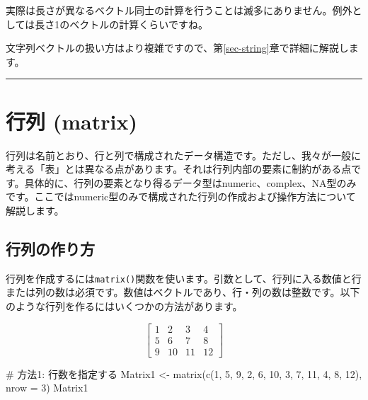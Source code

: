 \documentclass[
  a4paper,
  pandoc,
  ja=standard,
  jafont=haranoaji]{bxjsbook}
\newenvironment{Shaded}{\begin{snugshade}}{\end{snugshade}}
\newcommand{\AttributeTok}[1]{\textcolor[rgb]{0.00,0.48,0.65}{#1}}
\newcommand{\CommentTok}[1]{\textcolor[rgb]{0.37,0.37,0.37}{#1}}
\newcommand{\DecValTok}[1]{\textcolor[rgb]{0.68,0.00,0.00}{#1}}
\newcommand{\FunctionTok}[1]{\textcolor[rgb]{0.28,0.35,0.67}{#1}}
\newcommand{\NormalTok}[1]{\textcolor[rgb]{0.00,0.48,0.65}{#1}}
\newcommand{\OtherTok}[1]{\textcolor[rgb]{0.00,0.48,0.65}{#1}}
\begin{document}
実際は長さが異なるベクトル同士の計算を行うことは滅多にありません。例外としては長さ1のベクトルの計算くらいですね。

文字列ベクトルの扱い方はより複雑ですので、第\ref{sec-string}章で詳細に解説します。

\begin{center}\rule{0.5\linewidth}{0.5pt}\end{center}

\hypertarget{sec-datastructure_matrix}{%
\section{行列 (matrix)}\label{sec-datastructure_matrix}}

行列は名前とおり、行と列で構成されたデータ構造です。ただし、我々が一般に考える「表」とは異なる点があります。それは行列内部の要素に制約がある点です。具体的に、行列の要素となり得るデータ型はnumeric、complex、NA型のみです。ここではnumeric型のみで構成された行列の作成および操作方法について解説します。

\hypertarget{ux884cux5217ux306eux4f5cux308aux65b9}{%
\subsection{行列の作り方}\label{ux884cux5217ux306eux4f5cux308aux65b9}}

行列を作成するには\texttt{matrix()}関数を使います。引数として、行列に入る数値と行または列の数は必須です。数値はベクトルであり、行・列の数は整数です。以下のような行列を作るにはいくつかの方法があります。

\[
\left[
\begin{matrix} 
1 & 2 & 3 & 4 \\ 
5 & 6 & 7 & 8 \\
9 & 10 & 11 & 12
\end{matrix}
\right]
\]

\begin{Shaded}
\begin{Highlighting}[numbers=left,,]
\CommentTok{\# 方法1: 行数を指定する}
\NormalTok{Matrix1 }\OtherTok{\textless{}{-}} \FunctionTok{matrix}\NormalTok{(}\FunctionTok{c}\NormalTok{(}\DecValTok{1}\NormalTok{, }\DecValTok{5}\NormalTok{, }\DecValTok{9}\NormalTok{, }\DecValTok{2}\NormalTok{, }\DecValTok{6}\NormalTok{, }\DecValTok{10}\NormalTok{, }\DecValTok{3}\NormalTok{, }\DecValTok{7}\NormalTok{, }\DecValTok{11}\NormalTok{, }\DecValTok{4}\NormalTok{, }\DecValTok{8}\NormalTok{, }\DecValTok{12}\NormalTok{), }\AttributeTok{nrow =} \DecValTok{3}\NormalTok{)}
\NormalTok{Matrix1}
\end{Highlighting}
\end{Shaded}
\end{document}
